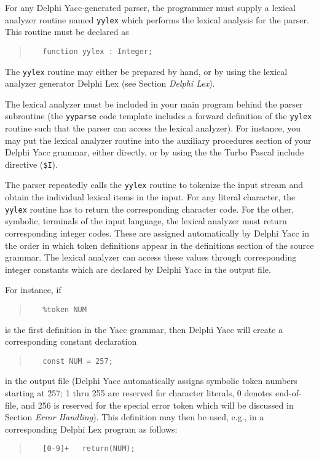 \documentclass{article}
\begin{document}
For any Delphi Yacc-generated parser, the programmer must supply a lexical
analyzer routine named \verb"yylex" which performs the lexical analysis for
the parser. This routine must be declared as

\begin{quote}\begin{verbatim}
   function yylex : Integer;
\end{verbatim}\end{quote}

The \verb"yylex" routine may either be prepared by hand, or by using the
lexical analyzer generator Delphi Lex (see Section {\em Delphi Lex\/}).

The lexical analyzer must be included in your main program behind the
parser subroutine (the \verb"yyparse" code template includes a forward
definition of the \verb"yylex" routine such that the parser can access the
lexical analyzer). For instance, you may put the lexical analyzer
routine into the auxiliary procedures section of your Delphi Yacc grammar,
either directly, or by using the the Turbo Pascal include directive
(\verb"$I").

The parser repeatedly calls the \verb"yylex" routine to tokenize the input
stream and obtain the individual lexical items in the input. For any
literal character, the \verb"yylex" routine has to return the corresponding
character code. For the other, symbolic, terminals of the input language,
the lexical analyzer must return corresponding integer codes. These are
assigned automatically by Delphi Yacc in the order in which token definitions
appear in the definitions section of the source grammar. The lexical
analyzer can access these values through corresponding integer constants
which are declared by Delphi Yacc in the output file.

For instance, if
\begin{quote}\begin{verbatim}
   %token NUM
\end{verbatim}\end{quote}
is the first definition in the Yacc grammar, then Delphi Yacc will create
a corresponding constant declaration
\begin{quote}\begin{verbatim}
   const NUM = 257;
\end{verbatim}\end{quote}
in the output file (Delphi Yacc automatically assigns symbolic token numbers
starting at 257; 1 thru 255 are reserved for character literals, 0 denotes
end-of-file, and 256 is reserved for the special error token which will be
discussed in Section {\em Error Handling\/}). This definition may then be
used, e.g., in a corresponding Delphi Lex program as follows:
\begin{quote}\begin{verbatim}
   [0-9]+   return(NUM);
\end{verbatim}\end{quote}
\end{document}
